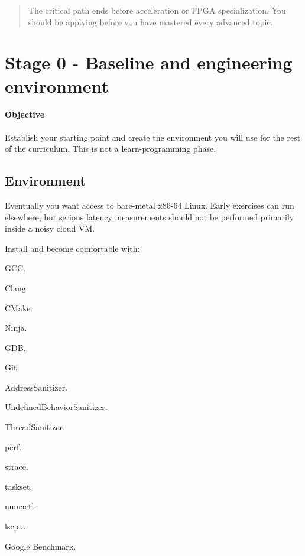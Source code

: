 \documentclass[11pt,letterpaper]{article}
\begin{document}
\begin{quote}
The critical path ends before acceleration or FPGA specialization. You should be applying before you have mastered every advanced topic.
\end{quote}

\clearpage

\section{Stage 0 - Baseline and engineering environment}\label{sec:4}

\label{stage:0}

\paragraph*{Objective}

Establish your starting point and create the environment you will use for the rest of the curriculum. This is not a learn-programming phase.

\subsection*{Environment}

Eventually you want access to bare-metal x86-64 Linux. Early exercises can run elsewhere, but serious latency measurements should not be performed primarily inside a noisy cloud VM.

Install and become comfortable with:

\begin{topics}

\item GCC.

\item Clang.

\item CMake.

\item Ninja.

\item GDB.

\item Git.

\item AddressSanitizer.

\item UndefinedBehaviorSanitizer.

\item ThreadSanitizer.

\item perf.

\item strace.

\item taskset.

\item numactl.

\item lscpu.

\item Google Benchmark.

\end{topics}
\end{document}
